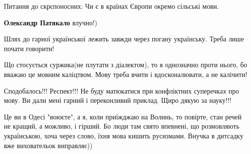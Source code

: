 \begin{itemize}
 
Питання до скрєпоносних: Чи є в країнах Європи окремо сільські мови.

\begin{itemize}
 
\textbf{Олександр Патякало} влучно!)
\end{itemize}

 

Шлях до гарної української лежить завжди через погану українську. Треба лише
почати говорити!

Що стосується суржика(не плутати з діалектом), то я однозначно проти нього, бо
вважаю це мовним каліцтвом. Мову треба вчити і вдосконалювати, а не калічити!


 

Сподобалось!!! Респект!!! Не буду матюкатися при конфліктних суперечках про
мову. Ви дали мені гарний і переконливий приклад. Щиро дякую за науку!!!


 

Це ви в Одесі "воюєте", а я, коли приїжджаю на Волинь, то повірте, стан речей
не кращий, а можливо, і гірший. Бо люди там свято впевнені, що розмовляють
українською, хоча через слово, їхня мова кишить русизмами. Внучка в дитсадку
вже виховательок виправляє))


\end{itemize}
